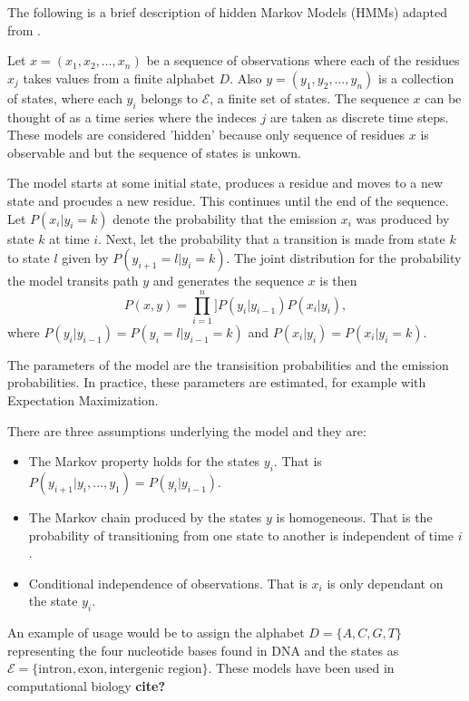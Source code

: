 The following is a brief description of hidden Markov Models (HMMs) adapted from \cite{mesa2016hidden}.

Let $x = (x_1,x_2,\ldots,x_n)$ be a sequence of observations where each of the residues $x_j$ takes values from a finite alphabet $D$. 
Also $y = (y_1,y_2,\ldots,y_n)$ is a collection of states, where each $y_i$ belongs to $\mathcal{E}$, a finite set of states. The sequence $x$ can be thought of as a time series where the indeces $j$ are taken as discrete time steps. These models are considered 'hidden' because only sequence of residues $x$ is observable and but the sequence of states is unkown.

The model starts at some initial state, produces a residue and moves to a new state and procudes a new residue. This continues until the end of the sequence. Let $P(x_i|y_i = k)$ denote the probability that the emission $x_i$ was produced by state $k$ at time $i$. Next, let the probability that a transition is made from state $k$ to state $l$ given by $P(y_{i+1} = l | y_i = k)$. The joint distribution for the probability the model transits path $y$ and generates the sequence $x$ is then
	\begin{equation}
		P(x,y) = \prod_{i=1}^{n} ]P(y_i|y_{i-1})P(x_i|y_i),
	\end{equation}
where $P(y_i|y_{i-1}) = P(y_{i} = l | y_{i-1} = k)$ and $P(x_i|y_i) = P(x_i|y_i = k)$. 

The parameters of the model are the transisition probabilities and the emission probabilities. In practice, these parameters are estimated, for example with Expectation Maximization.

There are three assumptions underlying the model and they are:
	\begin{itemize}
		\item The Markov property holds for the states $y_i$. That is $P(y_{i+1}|y_i,\ldots,y_1) = P(y_i|y_{i-1})$.
		\item The Markov chain produced by the states $y$ is homogeneous. That is the probability of transitioning from one state to another is independent of time $i$. 
		\item Conditional independence of observations. That is $x_i$ is only dependant on the state $y_i$. 
	\end{itemize}

An example of usage would be to assign the alphabet $D = \{A,C,G,T\}$ representing the four nucleotide bases found in DNA and the states as $\mathcal{E} = \{\text{intron}, \text{exon}, \text{intergenic region}\}$. These models have been used in computational biology \textbf{cite?}







